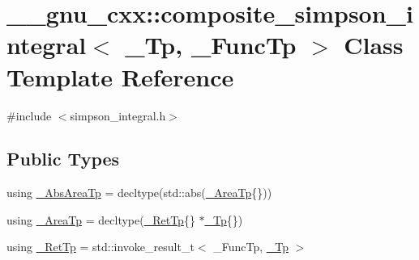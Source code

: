 \hypertarget{class____gnu__cxx_1_1composite__simpson__integral}{}\section{\+\_\+\+\_\+gnu\+\_\+cxx\+:\+:composite\+\_\+simpson\+\_\+integral$<$ \+\_\+\+Tp, \+\_\+\+Func\+Tp $>$ Class Template Reference}
\label{class____gnu__cxx_1_1composite__simpson__integral}


{\ttfamily \#include $<$simpson\+\_\+integral.\+h$>$}

\subsection*{Public Types}
\begin{DoxyCompactItemize}
\item 
using \hyperlink{class____gnu__cxx_1_1composite__simpson__integral_a7057fa13b914730f021356f761b6c448}{\+\_\+\+Abs\+Area\+Tp} = decltype(std\+::abs(\hyperlink{class____gnu__cxx_1_1composite__simpson__integral_a1a3ef5313bafc1d8523f2d517b066a7a}{\+\_\+\+Area\+Tp}\{\}))
\item 
using \hyperlink{class____gnu__cxx_1_1composite__simpson__integral_a1a3ef5313bafc1d8523f2d517b066a7a}{\+\_\+\+Area\+Tp} = decltype(\hyperlink{class____gnu__cxx_1_1composite__simpson__integral_a530008576c8a3a786e84ccbd96c93cc5}{\+\_\+\+Ret\+Tp}\{\} $\ast$\hyperlink{namespace____gnu__cxx_a3b19a9c800ca194374ef9172290f7d79}{\+\_\+\+Tp}\{\})
\item 
using \hyperlink{class____gnu__cxx_1_1composite__simpson__integral_a530008576c8a3a786e84ccbd96c93cc5}{\+\_\+\+Ret\+Tp} = std\+::invoke\+\_\+result\+\_\+t$<$ \+\_\+\+Func\+Tp, \hyperlink{namespace____gnu__cxx_a3b19a9c800ca194374ef9172290f7d79}{\+\_\+\+Tp} $>$
\end{DoxyCompactItemize}
